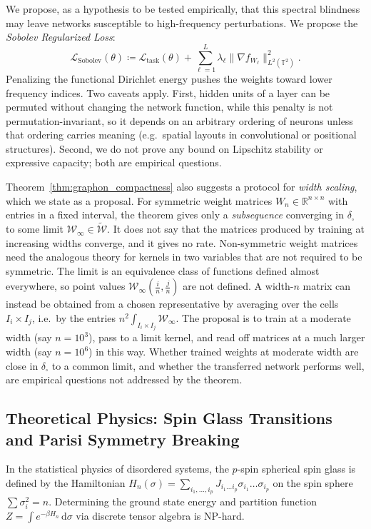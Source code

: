 \documentclass[11pt,a4paper,reqno]{amsart}
\theoremstyle{definition}
\numberwithin{equation}{section}
\providecommand{\R}{\mathbb{R}}
\newcommand{\Tor}{\mathbb{T}}
\newcommand{\dif}{\,\mathrm{d}}
\begin{document}
We propose, as a hypothesis to be tested empirically, that this spectral blindness may leave networks susceptible to high-frequency perturbations. We propose the \emph{Sobolev Regularized Loss}:
\begin{equation}
    \label{eq:sobolev_loss}
    \mathcal{L}_{\mathrm{Sobolev}}(\theta) \coloneqq \mathcal{L}_{\mathrm{task}}(\theta) + \sum_{\ell=1}^L \lambda_\ell \|\nabla f_{W_\ell}\|_{L^2(\Tor^2)}^2.
\end{equation}
Penalizing the functional Dirichlet energy pushes the weights toward lower frequency indices. Two caveats apply. First, hidden units of a layer can be permuted without changing the network function, while this penalty is not permutation-invariant, so it depends on an arbitrary ordering of neurons unless that ordering carries meaning (e.g.\ spatial layouts in convolutional or positional structures). Second, we do not prove any bound on Lipschitz stability or expressive capacity; both are empirical questions.

Theorem~\ref{thm:graphon_compactness} also suggests a protocol for \emph{width scaling}, which we state as a proposal. For symmetric weight matrices $W_n \in \R^{n \times n}$ with entries in a fixed interval, the theorem gives only a \emph{subsequence} converging in $\delta_\square$ to some limit $\mathcal{W}_\infty \in \widetilde{\mathcal{W}}$. It does not say that the matrices produced by training at increasing widths converge, and it gives no rate. Non-symmetric weight matrices need the analogous theory for kernels in two variables that are not required to be symmetric. The limit is an equivalence class of functions defined almost everywhere, so point values $\mathcal{W}_\infty(\frac{i}{n}, \frac{j}{n})$ are not defined. A width-$n$ matrix can instead be obtained from a chosen representative by averaging over the cells $I_i \times I_j$, i.e.\ by the entries $n^2 \int_{I_i \times I_j} \mathcal{W}_\infty$. The proposal is to train at a moderate width (say $n = 10^3$), pass to a limit kernel, and read off matrices at a much larger width (say $n = 10^6$) in this way. Whether trained weights at moderate width are close in $\delta_\square$ to a common limit, and whether the transferred network performs well, are empirical questions not addressed by the theorem.

\subsection{Theoretical Physics: Spin Glass Transitions and Parisi Symmetry Breaking}
\label{subsec:imp_physics}
In the statistical physics of disordered systems, the $p$-spin spherical spin glass is defined by the Hamiltonian $H_n(\sigma) = \sum_{i_1, \dots, i_p} J_{i_1 \dots i_p} \sigma_{i_1} \dots \sigma_{i_p}$ on the spin sphere $\sum \sigma_i^2 = n$. Determining the ground state energy and partition function $Z = \int e^{-\beta H_n} \dif \sigma$ via discrete tensor algebra is NP-hard.
\end{document}

